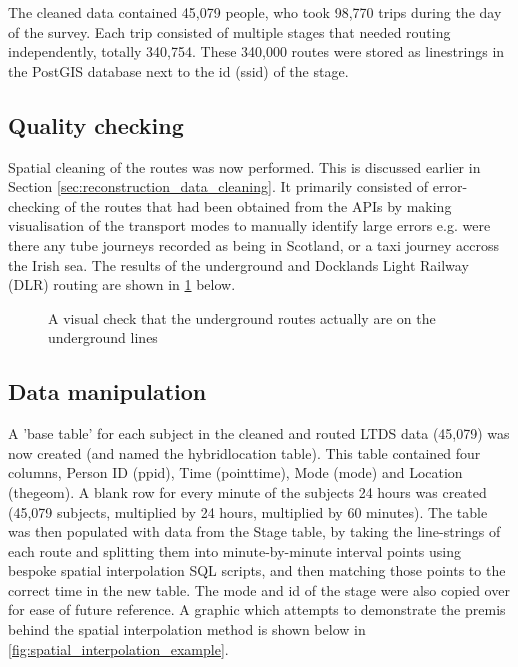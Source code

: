 The cleaned data contained 45,079 people, who took 98,770 trips during the day of the survey. Each trip consisted of multiple stages that needed routing independently, totally 340,754. These 340,000 routes were stored as linestrings in the PostGIS database next to the id (ssid) of the stage.

\subsection{Quality checking}
\label{sec:reconstruction_quality_checking}

Spatial cleaning of the routes was now performed. This is discussed earlier in Section \ref{sec:reconstruction_data_cleaning}. It primarily consisted of error-checking of the routes that had been obtained from the APIs by making visualisation of the transport modes to manually identify large errors e.g. were there any tube journeys recorded as being in Scotland, or a taxi journey accross the Irish sea. The results of the underground and Docklands Light Railway (DLR) routing are shown in \ref{fig:underground_routing} below.

\begin{landscape}

\begin{figure}[H]
\centering
{}
\caption{A visual check that the underground routes actually are on the underground lines}
\label{fig:underground_routing}
\end{figure}

\end{landscape}

\subsection{Data manipulation}
\label{sec:reconstruction_data_manipulation}

A 'base table' for each subject in the cleaned and routed LTDS data (45,079) was now created (and named the hybrid\textunderscore location table). This table contained four columns, Person ID (ppid), Time (pointtime), Mode (mode) and Location (thegeom). A blank row for every minute of the subjects 24 hours was created (45,079 subjects, multiplied by 24 hours, multiplied by 60 minutes). The table was then populated with data from the Stage table, by taking the line-strings of each route and splitting them into minute-by-minute interval points using bespoke spatial interpolation SQL scripts, and then matching those points to the correct time in the new table. The mode and id of the stage were also copied over for ease of future reference. A graphic which attempts to demonstrate the premis behind the spatial interpolation method is shown below in \ref{fig:spatial_interpolation_example}.

